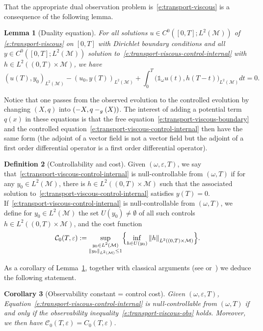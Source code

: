 \documentclass[JEP,XML,SOM,Unicode]{cedram}
\newtheorem{lemma}{Lemma}[section]
\newtheorem{corollary}[lemma]{Corollary}
\theoremstyle{definition}
\newtheorem{definition}[lemma]{Definition}
\newcommand{\M}{\ensuremath{\mathcal M}}
\let \div \relax
\DeclareMathOperator{\div}{div}
\newcommand\nor[2]{\left\|#1\right\|_{#2}}
\let\eps\varepsilon
\begin{document}
That the appropriate dual observation problem is~\eqref{e:transport-viscous} is a consequence of the following lemma.
\begin{lemma}[Duality equation]
\label{l:duality-equation-1}
For all solutions $u \in C^0([0,T]; L^2(\M))$ of \eqref{e:transport-viscous} on $[0,T]$ with Dirichlet boundary conditions and all $y\in C^0([0,T]; L^2(\M))$ solution to~\eqref{e:transport-viscous-control-internal} with $h \in L^2((0,T)\times \M)$, we have
\begin{equation}
\label{e:duality-equation-1}
(u(T), y_0)_{L^2(\M)} - (u_0, y(T))_{L^2(\M)} +\int_0^T\big(\mathds{1}_\omega u(t), h(T-t) \big)_{L^2(\M)} dt =0.
\end{equation}
\end{lemma}

Notice that one passes from the observed evolution to the controlled evolution by changing $(X, q)$ into $(-X, q-\div_{g}(X))$. The interest of adding a potential term $q(x)$ in these equations is that the free equation~\eqref{e:transport-viscous-boundary} and the controlled equation~\eqref{e:transport-viscous-control-internal} then have the same form (\ie the adjoint of a vector field is not a vector field but the adjoint of a first order differential operator is a first order differential operator).

\begin{definition}[Controllability and cost]
Given $(\omega, \eps, T)$, we say that~\eqref{e:transport-viscous-control-internal} is null-controllable from $(\omega, T)$ if for any $y_0 \in L^2(\M)$, there is $h \in L^2((0,T)\times \M)$ such that the associated solution to~\eqref{e:transport-viscous-control-internal} satisfies $y(T) =0$.
If~\eqref{e:transport-viscous-control-internal} is null-controllable from $(\omega, T)$, we define for $y_0 \in L^2(\M)$ the set $U(y_0) \neq \emptyset$ of all such controls $h \in L^2((0,T)\times \M)$, and the cost function
\[
\mathcal{C}_0(T,\eps) := \sup_{\substack{y_0 \in L^2(\M)\\ \nor{y_0}{L^2(\M)}\leq 1}} \Bigl\{\inf_{h \in U(y_0)} \nor{h}{L^2((0,T)\times \M)} \Bigr\}.
\]
\end{definition}
As a corollary of Lemma~\ref{l:duality-equation-1}, together with classical arguments (see \eg \cite{DR:77} or~\cite[Chap.\,2.3]{Cor:book}) we deduce the following statement.
\begin{corollary}[Observability constant = control cost]
\label{c:obscontrol}
Given $(\omega, \eps, T)$, Equation~\eqref{e:transport-viscous-control-internal} is null-controllable from $(\omega, T)$ if and only if the observability inequality~\eqref{e:transport-viscous-obs} holds.
Moreover, we then have $\mathcal{C}_0(T,\eps)= C_0(T,\eps)$.
\end{corollary}
\end{document}
